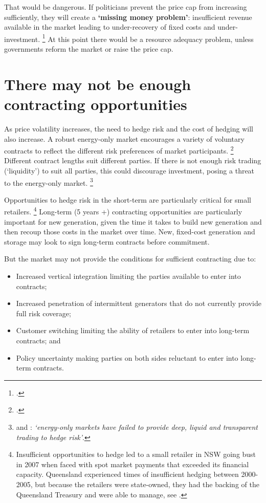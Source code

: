 \documentclass[FrontPage]{grattan}
\begin{document}
That would be dangerous. If politicians prevent the price cap from increasing sufficiently, they will create a \textbf{`missing money problem'}: insufficient revenue available in the market leading to under-recovery of fixed costs and under-investment.%
\footcites{Joskow2006CompetitiveElectricityMarkets}{Joskow2008CapacityPayments}
At this point there would be a resource adequacy problem, unless governments reform the market or raise the price cap.

\section{There may not be enough contracting opportunities}\label{sec:are-contracting-opportunities-sufficient}
As price volatility increases, the need to hedge risk and the cost of hedging will also increase. A robust energy-only market encourages a variety of voluntary contracts to reflect the different risk preferences of market participants.%
\footcites[][8]{hogan2005energy}[][3]{Yarrow2014Bidding}
Different contract lengths suit different parties. If there is not enough risk trading (`liquidity') to suit all parties, this could discourage investment, posing a threat to the energy-only market.%
\footnote{\eg{} \textcite{Gauthier2017TheNeedForLongtermContracts} and \textcite[][224]{helm2017burnout}: \emph{`energy-only markets have failed to provide deep, liquid and transparent trading to hedge risk'}.}

Opportunities to hedge risk in the short-term are particularly critical for small retailers.%
\footnote{Insufficient opportunities to hedge led to a small retailer in NSW going bust in 2007 when faced with spot market payments that exceeded its financial capacity. Queensland experienced times of insufficient hedging between 2000-2005, but because the retailers were state-owned, they had the backing of the Queensland Treasury and were able to manage, see \textcite[][14]{Simshauser2010EntryCostShock}.}
Long-term (5 years +) contracting opportunities are particularly important for new generation, given the time it takes to build new generation and then recoup those costs in the market over time. New, fixed-cost generation and storage may look to sign long-term contracts before commitment.

But the market may not provide the conditions for sufficient contracting due to:
\begin{itemize}
    \item Increased vertical integration limiting the parties available to enter into contracts;
    \item Increased penetration of intermittent generators that do not currently provide full risk coverage;
    \item Customer switching limiting the ability of retailers to enter into long-term contracts; and
    \item Policy uncertainty making parties on both sides reluctant to enter into long-term contracts.
\end{itemize}
\end{document}

